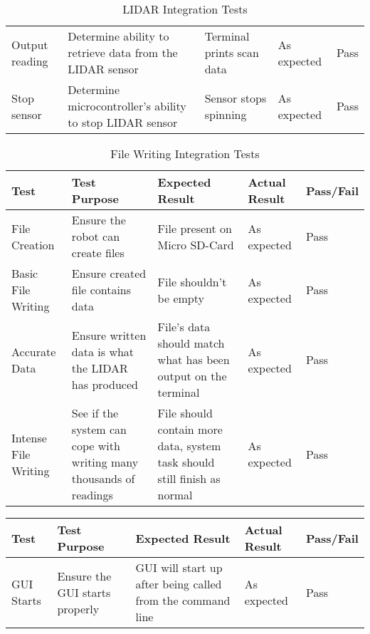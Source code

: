 \begin{appendices}
\begin{landscape}
\begin{table}[h!]
\begin{tabular}{| p{2.5cm} | p{5cm} | p{4cm} | p{3cm} | p{1.5cm} |}
							Output reading & Determine ability to retrieve data from the LIDAR sensor & Terminal prints scan data & As expected & Pass \\
							 
							Stop sensor & Determine microcontroller's ability to stop LIDAR sensor & Sensor stops spinning & As expected & Pass   \\ [1ex] 
							\hline
						\end{tabular}	
					\caption{LIDAR Integration Tests}	
					\label{table:lidartestbasic}
					\end{table}
				
					\begin{table}[h!]
						\centering
						\begin{tabular}{| p{2.5cm} | p{5cm} | p{4cm} | p{3cm} | p{1.5cm} |} 
							\hline
							Test & Test Purpose & Expected Result & Actual Result & Pass/Fail \\ [0.5ex] 
							\hline
							File Creation & Ensure the robot can create files & File present on Micro SD-Card & As expected & Pass  \\
							
							Basic File Writing & Ensure created file contains data & File shouldn't be empty & As expected & Pass \\
							
							Accurate Data & Ensure written data is what the LIDAR has produced & File's data should match what has been output on the terminal & As expected & Pass \\ 
							
							Intense File Writing & See if the system can cope with writing many thousands of readings & File should contain more data, system task should still finish as normal & As expected & Pass \\
							[1ex] 
							\hline
						\end{tabular}
					\caption{File Writing Integration Tests}
					\label{table:filewritingtests}		
					\end{table}
				
					\begin{table}[h!]
						\centering
						\begin{tabular}{| p{2.5cm} | p{5cm} | p{4cm} | p{3cm} | p{1.5cm} |} 
							\hline
							Test & Test Purpose & Expected Result & Actual Result & Pass/Fail \\ [0.5ex] 
							\hline
							GUI Starts & Ensure the GUI starts properly & GUI will start up after being called from the command line & As expected & Pass  \\
							

\end{tabular}
\end{table}
\end{landscape}
\end{appendices}
